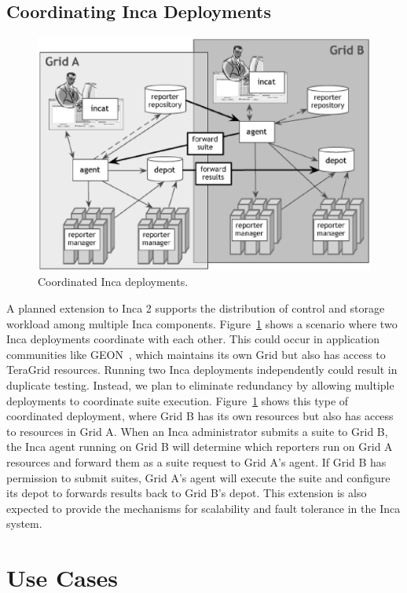 \documentclass{sig-alternate}
\begin{document}
\subsection{Coordinating Inca Deployments}

\begin{figure}[tbp]
  \centering
  \includegraphics[width=.6\textwidth]{vo.eps}
  \caption{\label{tg_coord_fig} Coordinated Inca deployments.}
\end{figure}

A planned extension to Inca 2 supports the distribution of control and storage
workload among multiple Inca components.  Figure~\ref{tg_coord_fig} shows a
scenario where two Inca deployments coordinate with each other.  This could
occur in application communities like GEON~\cite{geon}, which maintains its
own Grid but also has access to TeraGrid resources.   Running two Inca
deployments independently could result in duplicate testing.  Instead, we plan
to eliminate redundancy by allowing multiple deployments to coordinate suite
execution.
Figure~\ref{tg_coord_fig} shows this type of coordinated deployment, where Grid B 
has its own resources but also has access to resources in Grid A.
When an Inca administrator submits a suite to Grid B, the Inca agent running
on Grid B will determine which reporters run on Grid A resources and forward
them as a suite request to Grid A's agent.  If Grid B has permission to submit
suites, Grid A's agent will execute the suite and configure its depot to
forwards results back to Grid B's depot.  This extension is also expected
to provide the mechanisms for scalability and fault tolerance in the Inca
system.


\section{Use Cases}
\label{usecases}
\end{document}
